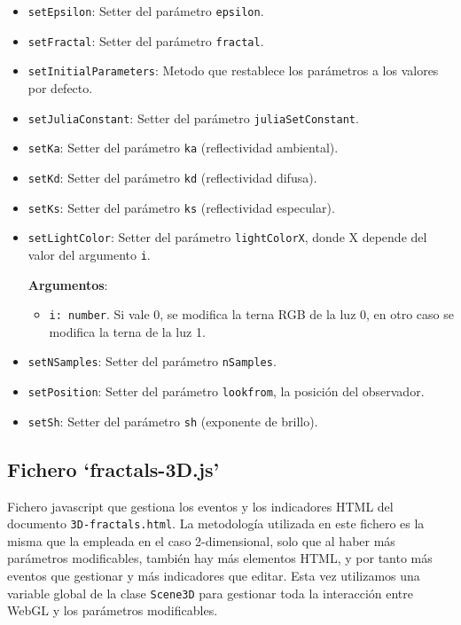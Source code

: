 \begin{itemize}
    \item \verb|setEpsilon|: Setter del parámetro \verb|epsilon|.
    \item \verb|setFractal|: Setter del parámetro \verb|fractal|.
    \item \verb|setInitialParameters|: Metodo que restablece los parámetros a los valores por defecto.
    \item \verb|setJuliaConstant|: Setter del parámetro \verb|juliaSetConstant|.
    \item \verb|setKa|: Setter del parámetro \verb|ka| (reflectividad ambiental).
    \item \verb|setKd|: Setter del parámetro \verb|kd| (reflectividad difusa).
    \item \verb|setKs|: Setter del parámetro \verb|ks| (reflectividad especular).
    \item \verb|setLightColor|: Setter del parámetro \verb|lightColorX|, donde X depende del valor del argumento \verb|i|.
    
    \textbf{Argumentos}:
    \begin{itemize}
        \item \verb|i: number|. Si vale 0, se modifica la terna RGB de la luz 0, en otro caso se modifica la terna de la luz 1.
    \end{itemize}
    \item \verb|setNSamples|: Setter del parámetro \verb|nSamples|.
    \item \verb|setPosition|: Setter del parámetro \verb|lookfrom|, la posición del observador.
    \item \verb|setSh|: Setter del parámetro \verb|sh| (exponente de brillo).
\end{itemize}

\subsection{Fichero `fractals-3D.js'}

Fichero javascript que gestiona los eventos y los indicadores HTML del documento \verb|3D-fractals.html|. La metodología utilizada en este fichero es la misma que la empleada en el caso 2-dimensional, solo que al haber más parámetros modificables, también hay más elementos HTML, y por tanto más eventos que gestionar y más indicadores que editar. Esta vez utilizamos una variable global de la clase \verb|Scene3D| para gestionar toda la interacción entre WebGL y los parámetros modificables.

